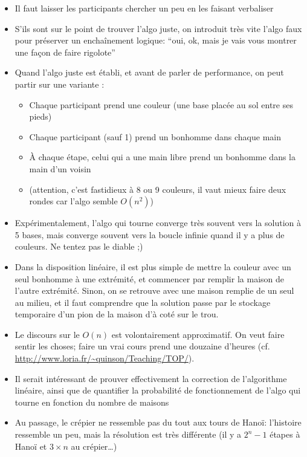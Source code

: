 \documentclass[a5paper,pagesize,DIV=14]{scrbook}
\begin{document}
\begin{itemize}
  \item Il faut laisser les participants chercher un peu en les faisant verbaliser
  \item S'ils sont sur le point de trouver l'algo juste, on introduit très vite l'algo faux pour préserver un enchaînement logique: ``oui, ok, mais je vais vous montrer une façon de faire rigolote''
  \item Quand l'algo juste est établi, et avant de parler de performance, on peut partir sur une variante :
    \begin{itemize}
    \item Chaque participant prend une couleur (une base placée au sol entre ses pieds)
    \item Chaque participant (sauf 1) prend un bonhomme dans chaque main
    \item À chaque étape, celui qui a une main libre prend un bonhomme dans la main d'un voisin
    \item (attention, c'est fastidieux à 8 ou 9 couleurs, il vaut mieux faire deux rondes car l'algo semble $O(n^2)$)
    \end{itemize}
  \item Expérimentalement, l'algo qui tourne converge très souvent vers la solution à 5 bases, mais converge souvent vers la boucle infinie quand il y a plus de couleurs. Ne tentez pas le diable ;)
  \item Dans la disposition linéaire, il est plus simple de mettre la couleur avec un seul bonhomme à une extrémité, et commencer par remplir la maison de l'autre extrémité. Sinon, on se retrouve avec une maison remplie de un seul au milieu, et il faut comprendre que la solution passe par le stockage temporaire d'un pion de la maison d'à coté sur le trou.
  \item Le discours sur le $O(n)$ est volontairement approximatif. On veut faire sentir les choses; faire un vrai cours prend une douzaine d'heures (cf. \url{http://www.loria.fr/~quinson/Teaching/TOP/}).
  \item Il serait intéressant de prouver effectivement la correction de l'algorithme linéaire, ainsi que de quantifier la probabilité de fonctionnement de l'algo qui tourne en fonction du nombre de maisons
  \item Au passage, le crépier ne ressemble pas du tout aux tours de Hanoï: l'histoire ressemble un peu, mais la résolution est très différente (il y a $2^n-1$ étapes à Hanoï et $3\times n$ au crépier\ldots)
\end{itemize}
\end{document}
